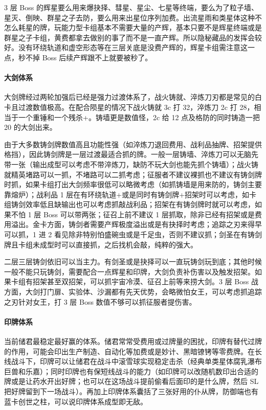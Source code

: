 ﻿\documentclass[12pt, a4paper]{article}
\begin{document}
3 层 Boss 的辉星要么用来爆抉择、彗星、星尘、七星等终端，要么为了粒子墙、星灭、倒映、群星之子去防，要么用来出星位序列加费。出流星雨和类星体这种不怎么耗星的牌，玩能力型卡组基本不需要大量的产辉，基本只要不是辉星终端或是群星之子卡组，黄费都拿去做别的事了而不是一直产辉。所以隐秘藏品的发挥会较好。没有环绕轨道和虚空形态等在三层关底是没费产辉的，辉星卡组需注意这一点，秒不掉 Boss 后续产辉跟不上就要被秒了。

\paragraph{大剑体系}
大剑牌经过两轮加强后已经是强力过渡体系了，战火铸就、淬炼刀刃都是常见的白卡且过渡数值极高。在配合陨星的情况下战火铸就 3c 打 32，淬炼刀 2c 打 28，相当于一个重锤和一个残杀+。铸墙更是数值怪，2c 给 12 点及格防的同时铸造一把 20 的大剑出来。

由于大多数铸剑牌数值高且功能性强（如淬炼刀退回费用、战利品抽牌、招架提供格挡），因此铸剑牌是一层过渡最适合抓的牌。一般一层铸墙、淬炼刀可以无脑先带一张（输出成型可以考虑不带淬炼刀，缺防不玩大剑也能先抓个铸墙）；战火铸就精英堵路可以一抓，不堵路可以二抓考虑；征服者不建议裸抓也不建议有铸剑牌时抓，如果卡组打出大剑频率很低可以略微考虑（如抓铸墙是用来防的，铸剑主要靠熔炉）；战利品 1 层在有环绕轨道+或是同时有铸剑牌+招架时可以考虑，如卡组铸剑效率低且缺输出也可以考虑抓敲战利品；招架在有铸剑牌时就可以考虑，如果不怕 1 层 Boss 可以带两张；征召上前不建议 1 层抓取，除非已经有招架或是费用溢出。金卡方面，铸剑者需要产辉极度溢出或是有抉择时考虑；追踪之刃来得早可以抓，1 进 2 看见除非特别怕盛碗虫或是千足虫，否则不建议抓；剑圣在有铸剑牌且卡组未成型时可以直接抓，之后找机会敲，纯粹的强大。

二层三层铸剑依旧可以当主力。有剑圣或是抉择可以一直玩铸剑玩到底；其他时候一般不能只玩铸剑，需要配合一点辉星和印牌，大剑负责补伤害以及触发招架。如果卡组有招架甚至双招架，可以抓宇宙冷漠、征召上前等来捞大剑。3 层 Boss 战方面，大剑打门扉、实验体、沙漏都有先天优势，会略微怕女王，可以考虑抓追踪之刃针对女王，打 3 层 Boss 数值不够可以抓征服者提伤害。

\paragraph{印牌体系}
当前储君最稳定最好赢的体系。储君常常受费用或过牌量的困扰，印牌有替代过牌的作用，可能会印出生产制造、自动化等加费或是妙计、黑暗镣铐等零费牌。在长线战斗下，印牌可以让储君在战斗中滚雪球实现稳定击杀（经典单类星体腐乳瀑布巨兽和乐嘉）；同时印牌也有保短线战斗的能力（如印牌可以改随机数印出合适的牌或是让药水开出好牌；也可以在这场战斗提前偷看后面印的是什么牌，然后 SL 把好牌留到下一场战斗）。再加上印牌体系囊括了三张好用的仆从牌，防御端也有蓝卡创世之柱，可以说印牌体系成型即无敌。
\end{document}
